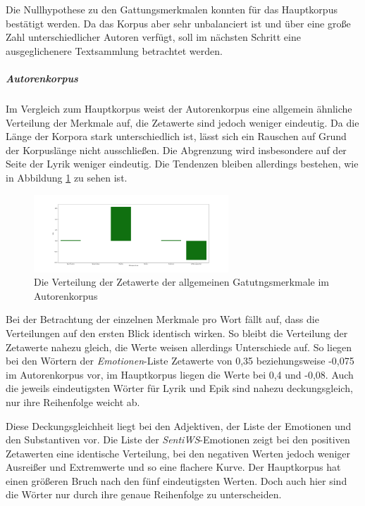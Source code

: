 \documentclass[a4paper,10p]{article}
\begin{document}
Die Nullhypothese zu den Gattungsmerkmalen konnten für das Hauptkorpus bestätigt werden. Da das Korpus aber sehr unbalanciert ist und über eine große Zahl unterschiedlicher Autoren verfügt, soll im nächsten Schritt eine ausgeglichenere Textsammlung betrachtet werden.

\subparagraph{Autorenkorpus} \quad \par 

Im Vergleich zum Hauptkorpus  weist der Autorenkorpus eine allgemein ähn\-lich\-e Verteilung der Merkmale auf, die  Zetawerte sind jedoch weniger eindeutig. Da die Länge der Korpora stark unterschiedlich ist, lässt sich ein Rauschen auf Grund der Korpuslänge nicht ausschließen. Die Abgrenzung wird insbesondere auf der Seite der Lyrik weniger eindeutig. Die Tendenzen bleiben allerdings bestehen, wie in Abbildung  \ref{fig:autoren_alle_merkmale} zu sehen ist. \par 

\begin{figure}
	\includegraphics[width=0.65\textwidth]{autoren_alle_merkmale.png}
	\caption{Die Verteilung der Zetawerte der allgemeinen Gatutngsmerkmale im Autorenkorpus}
	\label{fig:autoren_alle_merkmale}
\end{figure}

Bei der Betrachtung der einzelnen Merkmale pro Wort fällt auf, dass die Verteilungen auf den ersten Blick identisch wirken. So bleibt die Verteilung der Zetawerte nahezu gleich, die Werte weisen allerdings Unterschiede auf. So liegen bei den Wörtern der \emph{Emotionen}-Liste Zetawerte von 0,35 beziehungsweise -0,075 im Autorenkorpus vor, im Hauptkorpus liegen die Werte bei 0,4 und -0,08. Auch die jeweils eindeutigsten Wörter für Lyrik und Epik sind nahezu deckungsgleich, nur ihre Reihenfolge weicht ab. \par 

Diese Deckungsgleichheit liegt bei den Adjektiven, der Liste der Emotionen und den Substantiven vor. Die Liste der \emph{SentiWS}-Emotionen zeigt bei den positiven Zetawerten eine identische Verteilung,  bei den negativen Werten jedoch weniger Ausreißer und Extremwerte und so eine flachere Kurve. Der Hauptkorpus hat einen größeren Bruch nach den fünf eindeutigsten Werten. Doch auch hier sind die Wörter nur durch ihre genaue Reihenfolge zu unterscheiden.  \par 
\end{document}
